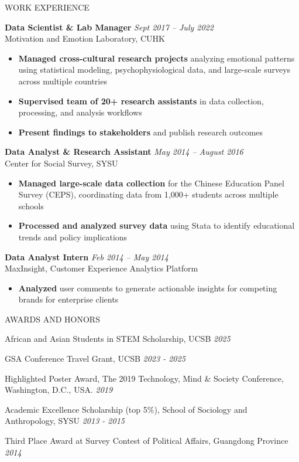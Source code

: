 \documentclass{resume} %
\begin{document}
\begin{rSection}{WORK	EXPERIENCE}

\item \textbf{ Data Scientist \& Lab Manager} \hfill {\em Sept 2017 -- July 2022} \\
Motivation and Emotion Laboratory, CUHK
\begin{itemize}[leftmargin=*, noitemsep, topsep=2pt]
\item \textbf{Managed cross-cultural research projects} analyzing emotional patterns using statistical modeling, psychophysiological data, and large-scale surveys across multiple countries
\item \textbf{Supervised team of 20+ research assistants} in data collection, processing, and analysis workflows
\item \textbf{Present findings to stakeholders} and publish research outcomes
\end{itemize}

\item \textbf{Data Analyst \& Research Assistant } \hfill {\em May 2014 -- August 2016} \\
Center for Social Survey, SYSU
\begin{itemize}[leftmargin=*, noitemsep, topsep=2pt]
\item \textbf{Managed large-scale data collection} for the Chinese Education Panel Survey (CEPS), coordinating data from 1,000+ students across multiple schools
\item \textbf{Processed and analyzed survey data} using Stata to identify educational trends and policy implications
\end{itemize}


\item \textbf{Data Analyst Intern} \hfill {\em Feb 2014 -- May 2014} \\
MaxInsight, Customer Experience Analytics Platform
\begin{itemize}[leftmargin=*, noitemsep, topsep=2pt]
\item \textbf{Analyzed} user comments to generate actionable insights for competing brands for enterprise clients
\end{itemize}

\end{rSection}
\begin{rSection}{AWARDS AND HONORS}
\item African and Asian Students in STEM Scholarship, UCSB \hfill {\em 2025}
\item GSA Conference Travel Grant, UCSB \hfill {\em 2023 - 2025}
\item Highlighted Poster Award, The 2019 Technology, Mind \& Society Conference, Washington, D.C., USA. \hfill {\em 2019}
\item Academic Excellence Scholarship (top 5\%), School of Sociology and Anthropology, SYSU \hfill {\em 2013 - 2015} 
\item Third Place Award at Survey Contest of Political Affairs, Guangdong Province \hfill {\em 2014} \\

\end{rSection}
\end{document}

